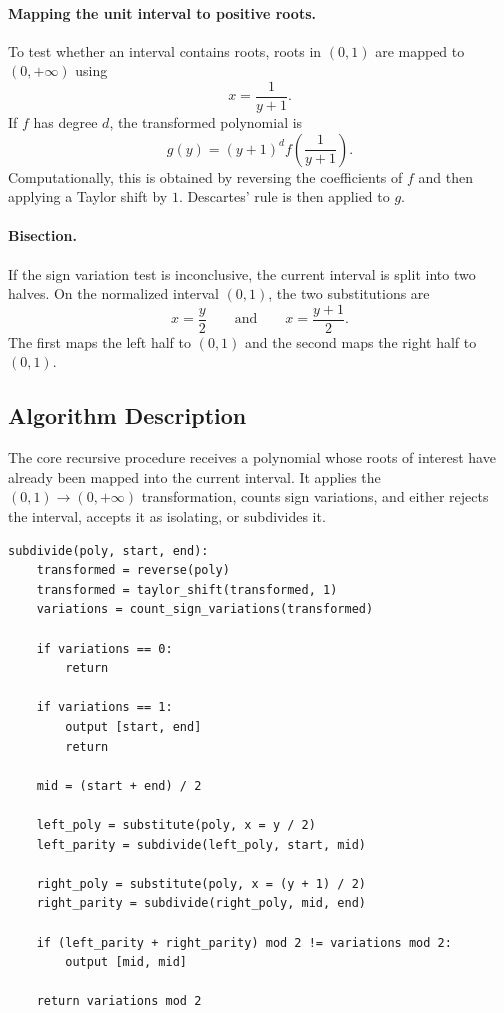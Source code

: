 \documentclass[letterpaper]{article}
\begin{document}
\paragraph{Mapping the unit interval to positive roots.}
To test whether an interval contains roots, roots in $(0,1)$ are mapped to
$(0,+\infty)$ using
\[
  x = \frac{1}{y+1}.
\]
If $f$ has degree $d$, the transformed polynomial is
\[
  g(y) = (y+1)^d f\!\left(\frac{1}{y+1}\right).
\]
Computationally, this is obtained by reversing the coefficients of $f$ and
then applying a Taylor shift by $1$. Descartes' rule is then applied to $g$.

\paragraph{Bisection.}
If the sign variation test is inconclusive, the current interval is split into
two halves. On the normalized interval $(0,1)$, the two substitutions are
\[
  x = \frac{y}{2}
  \qquad\text{and}\qquad
  x = \frac{y+1}{2}.
\]
The first maps the left half to $(0,1)$ and the second maps the right half to
$(0,1)$.

\subsection{Algorithm Description}

The core recursive procedure receives a polynomial whose roots of interest
have already been mapped into the current interval. It applies the
$(0,1)\rightarrow(0,+\infty)$ transformation, counts sign variations, and
either rejects the interval, accepts it as isolating, or subdivides it.

\begin{lstlisting}
subdivide(poly, start, end):
    transformed = reverse(poly)
    transformed = taylor_shift(transformed, 1)
    variations = count_sign_variations(transformed)

    if variations == 0:
        return

    if variations == 1:
        output [start, end]
        return

    mid = (start + end) / 2

    left_poly = substitute(poly, x = y / 2)
    left_parity = subdivide(left_poly, start, mid)

    right_poly = substitute(poly, x = (y + 1) / 2)
    right_parity = subdivide(right_poly, mid, end)

    if (left_parity + right_parity) mod 2 != variations mod 2:
        output [mid, mid]

    return variations mod 2
\end{lstlisting}
\end{document}
